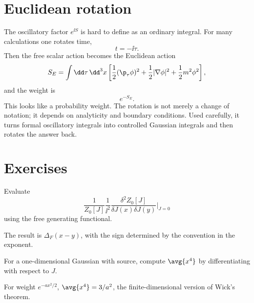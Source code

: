 \section{Euclidean rotation}

The oscillatory factor \(e^{\ii S}\) is hard to define as an ordinary integral.  For many calculations one rotates time,
\[
  t=-\ii\tau.
\]
Then the free scalar action becomes the Euclidean action
\[
  S_E=\int\dd\tau\,\dd^3x
  \left[
  \frac12(\p_\tau\phi)^2
  +\frac12|\nabla\phi|^2
  +\frac12m^2\phi^2
  \right],
\]
and the weight is
\[
  e^{-S_E}.
\]
This looks like a probability weight.  The rotation is not merely a change of notation; it depends on analyticity and boundary conditions.  Used carefully, it turns formal oscillatory integrals into controlled Gaussian integrals and then rotates the answer back.

\section*{Exercises}

\begin{exercise}
Evaluate
\[
  \frac{1}{Z_0[J]}\frac1{\ii^2}
  \frac{\delta^2Z_0[J]}{\delta J(x)\delta J(y)}
  \bigg|_{J=0}
\]
using the free generating functional.
\begin{answer}
The result is \(\Delta_F(x-y)\), with the sign determined by the convention in the exponent.
\end{answer}
\end{exercise}

\begin{exercise}
For a one-dimensional Gaussian with source, compute \(\avg{x^4}\) by differentiating with respect to \(J\).
\begin{answer}
For weight \(e^{-ax^2/2}\), \(\avg{x^4}=3/a^2\), the finite-dimensional version of Wick's theorem.
\end{answer}
\end{exercise}
